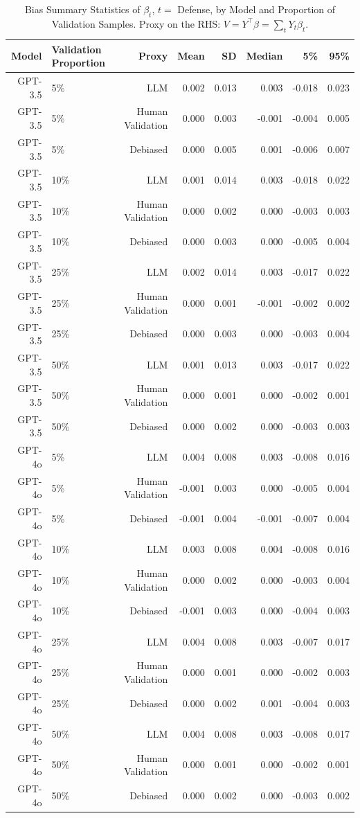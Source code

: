 \begin{table}

\caption{Bias Summary Statistics of $\beta_{t}$, $t=$ Defense, by Model and Proportion of Validation Samples.
      Proxy on the RHS: $V = Y^\top \beta = \sum_{t} Y_t \beta_t$.}
\centering
\begin{tabular}[t]{rlrrrrrr}
\toprule
Model & Validation Proportion & Proxy & Mean & SD & Median & 5\% & 95\%\\
\midrule
GPT-3.5 & 5\% & LLM & 0.002 & 0.013 & 0.003 & -0.018 & 0.023\\
GPT-3.5 & 5\% & Human Validation & 0.000 & 0.003 & -0.001 & -0.004 & 0.005\\
GPT-3.5 & 5\% & Debiased & 0.000 & 0.005 & 0.001 & -0.006 & 0.007\\
GPT-3.5 & 10\% & LLM & 0.001 & 0.014 & 0.003 & -0.018 & 0.022\\
GPT-3.5 & 10\% & Human Validation & 0.000 & 0.002 & 0.000 & -0.003 & 0.003\\
GPT-3.5 & 10\% & Debiased & 0.000 & 0.003 & 0.000 & -0.005 & 0.004\\
GPT-3.5 & 25\% & LLM & 0.002 & 0.014 & 0.003 & -0.017 & 0.022\\
GPT-3.5 & 25\% & Human Validation & 0.000 & 0.001 & -0.001 & -0.002 & 0.002\\
GPT-3.5 & 25\% & Debiased & 0.000 & 0.003 & 0.000 & -0.003 & 0.004\\
GPT-3.5 & 50\% & LLM & 0.001 & 0.013 & 0.003 & -0.017 & 0.022\\
GPT-3.5 & 50\% & Human Validation & 0.000 & 0.001 & 0.000 & -0.002 & 0.001\\
GPT-3.5 & 50\% & Debiased & 0.000 & 0.002 & 0.000 & -0.003 & 0.003\\
GPT-4o & 5\% & LLM & 0.004 & 0.008 & 0.003 & -0.008 & 0.016\\
GPT-4o & 5\% & Human Validation & -0.001 & 0.003 & 0.000 & -0.005 & 0.004\\
GPT-4o & 5\% & Debiased & -0.001 & 0.004 & -0.001 & -0.007 & 0.004\\
GPT-4o & 10\% & LLM & 0.003 & 0.008 & 0.004 & -0.008 & 0.016\\
GPT-4o & 10\% & Human Validation & 0.000 & 0.002 & 0.000 & -0.003 & 0.004\\
GPT-4o & 10\% & Debiased & -0.001 & 0.003 & 0.000 & -0.004 & 0.003\\
GPT-4o & 25\% & LLM & 0.004 & 0.008 & 0.003 & -0.007 & 0.017\\
GPT-4o & 25\% & Human Validation & 0.000 & 0.001 & 0.000 & -0.002 & 0.003\\
GPT-4o & 25\% & Debiased & 0.000 & 0.002 & 0.001 & -0.004 & 0.003\\
GPT-4o & 50\% & LLM & 0.004 & 0.008 & 0.003 & -0.008 & 0.017\\
GPT-4o & 50\% & Human Validation & 0.000 & 0.001 & 0.000 & -0.002 & 0.001\\
GPT-4o & 50\% & Debiased & 0.000 & 0.002 & 0.000 & -0.003 & 0.002\\
\bottomrule
\end{tabular}
\end{table}
